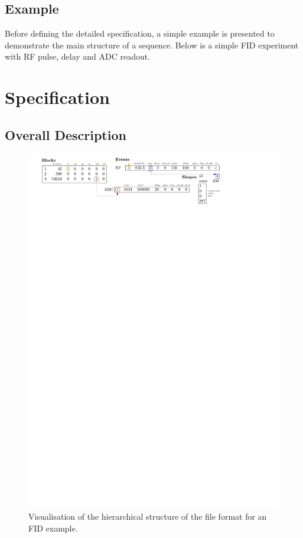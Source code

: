 \documentclass{article}
\begin{document}
\subsection{Example}

Before defining the detailed specification, a simple example is presented to demonstrate the main structure of a sequence. Below is a simple FID experiment with RF pulse, delay and ADC readout. 




\section{Specification}\label{sec:specification}

\subsection{Overall Description}

\begin{figure}[H]
\includegraphics[width=\columnwidth]{block_diagram}
\caption{Visualisation of the hierarchical structure of the file format for an FID example. \label{fig:block_diagram}}
\end{figure}
\end{document}
